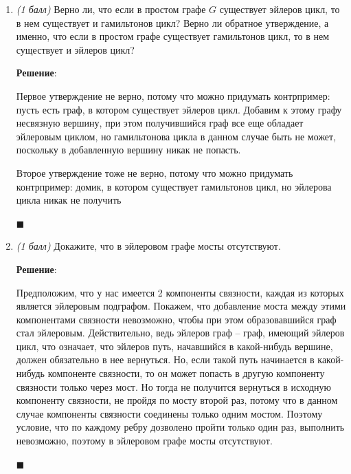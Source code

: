 \documentclass{article}
\begin{document}
\begin{enumerate}

    \item \textit{(1 балл)} Верно ли, что если в простом графе $G$ существует эйлеров цикл, то в нем существует и гамильтонов цикл? Верно ли обратное утверждение, а именно, что если в простом графе существует гамильтонов цикл, то в нем существует и эйлеров цикл?
    
    \textbf{Решение}:

    Первое утверждение не верно, потому что можно придумать контрпример: пусть есть граф, в котором существует эйлеров цикл. Добавим к этому графу несвязную вершину, при этом получившийся граф все еще обладает эйлеровым циклом, но гамильтонова цикла в данном случае быть не может, поскольку в добавленную вершину никак не попасть.

    Второе утверждение тоже не верно, потому что можно придумать контрпример: домик, в котором существует гамильтонов цикл, но эйлерова цикла никак не получить
    \begin{figure}[h!]
        \centering
    \end{figure}
    \begin{flushright}
        $\blacksquare$
    \end{flushright}
    
    \item \textit{(1 балл)} Докажите, что в эйлеровом графе мосты отсутствуют.
    
    \textbf{Решение}:

    Предположим, что у нас имеется 2 компоненты связности, каждая из которых является эйлеровым подграфом. Покажем, что добавление моста между этими компонентами связности невозможно, чтобы при этом образовавшийся граф стал эйлеровым. Действительно, ведь эйлеров граф -- граф, имеющий эйлеров цикл, что означает, что эйлеров путь, начавшийся в какой-нибудь вершине, должен обязательно в нее вернуться. Но, если такой путь начинается в какой-нибудь компоненте связности, то он может попасть в другую компоненту связности только через мост. Но тогда не получится вернуться в исходную компоненту связности, не пройдя по мосту второй раз, потому что в данном случае компоненты связности соединены только одним мостом. Поэтому условие, что по каждому ребру дозволено пройти только один раз, выполнить невозможно, поэтому в эйлеровом графе мосты отсутствуют.
    \begin{flushright}
        $\blacksquare$
    \end{flushright}
    

\end{enumerate}
\end{document}
